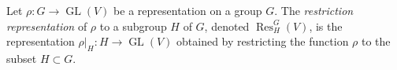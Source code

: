 \documentclass[12pt]{article}
\newcommand{\GL}{\operatorname{GL}}
\begin{document}
Let $\rho: G \longrightarrow \GL(V)$ be a representation on a group $G$. The {\em restriction representation} of $\rho$ to a subgroup $H$ of $G$, denoted $\operatorname{Res}^G_H(V)$, is the representation $\rho|_H: H \longrightarrow \GL(V)$ obtained by restricting the function $\rho$ to the subset $H \subset G$.
\end{document}
